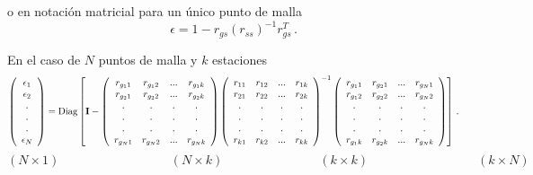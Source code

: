 \documentclass[
]{agujournal2019}
\begin{document}
o en notación matricial para un único punto de malla
\[\epsilon=1-r_{gs}(r_{ss})^{-1}r^T_{gs}\,.\]

En el caso de \(N\) puntos de malla y \(k\) estaciones
\[\left(\begin{array}{ccc}
  \epsilon_{1} \\
  \epsilon_{2} \\
  . \\
  . \\
  . \\
  \epsilon_{N} \\
     \end{array}\right)=\text{Diag}\left[
     {\textbf I}-
\left(\begin{array}{ccccc}
  r_{g_11} & r_{g_12} &... &  r_{g_1k}\\
  r_{g_21} & r_{g_22} &... &  r_{g_2k}\\
  . & . & . & . \\
  . & . & . & . \\
  . & . & . & . \\
  r_{g_N1} & r_{g_N2} & ... & r_{g_Nk}\\
     \end{array}\right)
 \left(\begin{array}{ccccc}
  r_{11} & r_{12} &... &  r_{1k}\\
  r_{21} & r_{22} &... &  r_{2k}\\
  . & . & . & . \\
  . & . & . & . \\
  . & . & . & . \\
  r_{k1} & r_{k2} & ... & r_{kk}\\
     \end{array}\right)^{-1}
\left(\begin{array}{ccccc}
  r_{g_11} & r_{g_21} &... &  r_{g_N1}\\
  r_{g_12} & r_{g_22} &... &  r_{g_N2}\\
  . & . & . & . \\
  . & . & . & . \\
  . & . & . & . \\
  r_{g_1k} & r_{g_2k} & ... & r_{g_Nk}\\
     \end{array}\right) \right]
     \,.\]
\[\left( N \times 1 \right)\,\,\,\,\,\,\,\,\,\,\,\,\,\,\,\,\,\,\,\,\,\,\,\,\,\,\,\,\,\,\,\,\,\,\,\,\,\,\,\,\,\,\,\,\,\,\,\,\,\,\,\,\,
  \left( N \times k \right)\,\,\,\,\,\,\,\,\,\,\,\,\,\,\,\,\,\,\,\,\,\,\,\,\,\,\,\,\,\,\,\,\,\,\,\,\,\,
  \,\,\,\,\,\,\,\,\left( k \times k \right)\,\,\,\,\,\,\,\,\,\,\,\,\,\,\,\,\,\,\,\,\,\,\,\,\,\,\,\,\,\,\,\,\,\,\,\,\,\,\,\,\,\,\,\,\,\,\,\,\,\,\,\,
  \left( k \times N \right)\,\,\,\,\,\,\,\,\,\,\,\,\,\,\,\,\,\,\,\,\,\,\,\,\,\,\,\,\,\,\,\,\,\,\,\,\,\,\,\]
\end{document}
